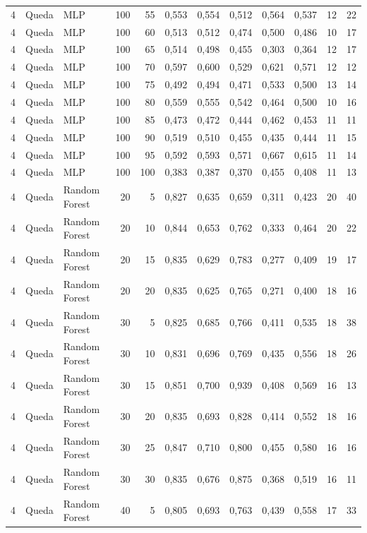 \begin{longtable}{@{}rllrrrrrrrrr@{}}
4 & Queda & MLP & 100 & 55 & 0,553 & 0,554 & 0,512 & 0,564 & 0,537 & 12 & 22 \\
4 & Queda & MLP & 100 & 60 & 0,513 & 0,512 & 0,474 & 0,500 & 0,486 & 10 & 17 \\
4 & Queda & MLP & 100 & 65 & 0,514 & 0,498 & 0,455 & 0,303 & 0,364 & 12 & 17 \\
4 & Queda & MLP & 100 & 70 & 0,597 & 0,600 & 0,529 & 0,621 & 0,571 & 12 & 12 \\
4 & Queda & MLP & 100 & 75 & 0,492 & 0,494 & 0,471 & 0,533 & 0,500 & 13 & 14 \\
4 & Queda & MLP & 100 & 80 & 0,559 & 0,555 & 0,542 & 0,464 & 0,500 & 10 & 16 \\
4 & Queda & MLP & 100 & 85 & 0,473 & 0,472 & 0,444 & 0,462 & 0,453 & 11 & 11 \\
4 & Queda & MLP & 100 & 90 & 0,519 & 0,510 & 0,455 & 0,435 & 0,444 & 11 & 15 \\
4 & Queda & MLP & 100 & 95 & 0,592 & 0,593 & 0,571 & 0,667 & 0,615 & 11 & 14 \\
4 & Queda & MLP & 100 & 100 & 0,383 & 0,387 & 0,370 & 0,455 & 0,408 & 11 & 13 \\
4 & Queda & Random Forest & 20 & 5 & 0,827 & 0,635 & 0,659 & 0,311 & 0,423 & 20 & 40 \\
4 & Queda & Random Forest & 20 & 10 & 0,844 & 0,653 & 0,762 & 0,333 & 0,464 & 20 & 22 \\
4 & Queda & Random Forest & 20 & 15 & 0,835 & 0,629 & 0,783 & 0,277 & 0,409 & 19 & 17 \\
4 & Queda & Random Forest & 20 & 20 & 0,835 & 0,625 & 0,765 & 0,271 & 0,400 & 18 & 16 \\
4 & Queda & Random Forest & 30 & 5 & 0,825 & 0,685 & 0,766 & 0,411 & 0,535 & 18 & 38 \\
4 & Queda & Random Forest & 30 & 10 & 0,831 & 0,696 & 0,769 & 0,435 & 0,556 & 18 & 26 \\
4 & Queda & Random Forest & 30 & 15 & 0,851 & 0,700 & 0,939 & 0,408 & 0,569 & 16 & 13 \\
4 & Queda & Random Forest & 30 & 20 & 0,835 & 0,693 & 0,828 & 0,414 & 0,552 & 18 & 16 \\
4 & Queda & Random Forest & 30 & 25 & 0,847 & 0,710 & 0,800 & 0,455 & 0,580 & 16 & 16 \\
4 & Queda & Random Forest & 30 & 30 & 0,835 & 0,676 & 0,875 & 0,368 & 0,519 & 16 & 11 \\
4 & Queda & Random Forest & 40 & 5 & 0,805 & 0,693 & 0,763 & 0,439 & 0,558 & 17 & 33 \\

\end{longtable}

